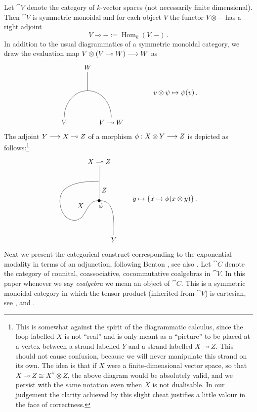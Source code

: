 \documentclass[english,letter paper,12pt,reqno]{article}
\def\mapnode{\node[circle,draw=black,fill=black,inner sep=0.5mm]}
\theoremstyle{example}
\def\Hom{\operatorname{Hom}}
\begin{document}
Let $\cat{V}$ denote the category of $k$-vector spaces (not necessarily finite dimensional). Then $\cat{V}$ is symmetric monoidal and for each object $V$ the functor $V \otimes -$ has a right adjoint
\[
V \multimap - := \Hom_k(V, -)\,.
\]
In addition to the usual diagrammatics of a symmetric monoidal category, we draw the evaluation map $V \otimes (V \multimap W) \longrightarrow W$ as
\begin{equation}\label{eq:diagram_eval_map}
\begin{tikzpicture}[scale=0.4,auto,baseline=(current  bounding  box.center)]
\node (topr) at (0,3) {$W$};
\coordinate (o) at (0,0) {};
\node (bottoml) at (-3,-4) {$V$};
\node (bottomr) at (3,-4) {$V \multimap W$};
\draw[out=90,in=180] (bottoml) to (o);
\draw[out=90,in=0] (bottomr) to (o);
\draw (o) to (topr);
\end{tikzpicture}
\qquad\qquad
v \otimes \psi \mapsto \psi(v)\,.
\end{equation}
The adjoint $Y \longrightarrow X \multimap Z$ of a morphism $\phi: X \otimes Y \longrightarrow Z$ is depicted as follows:\footnote{This is somewhat against the spirit of the diagrammatic calculus, since the loop labelled $X$ is not ``real'' and is only meant as a ``picture'' to be placed at a vertex between a strand labelled $Y$ and a strand labelled $X \multimap Z$. This should not cause confusion, because we will never manipulate this strand on its own. The idea is that if $X$ were a finite-dimensional vector space, so that $X \multimap Z \cong X^{\vee} \otimes Z$, the above diagram would be absolutely valid, and we persist with the same notation even when $X$ is not dualisable. In our judgement the clarity achieved by this slight cheat justifies a little valour in the face of correctness.}
\begin{equation}\label{eq:diagram_adjoint_of_map}
\begin{tikzpicture}[scale=0.5,auto,baseline=(current  bounding  box.center)]
\node (topr) at (1,4) {$X \multimap Z$};
\mapnode (o) at (1,0) {};
\node [below] at (o.east) {$\phi$};
\node (gamma) at (2.5,-4) {$Y$};
\draw[out=90,in=0] (gamma) to (o);
\draw[out=0,in=180] (-1.5,-2) to node {$X$} (o);
\draw[out=180,in=270] (-1.5,-2) to (-3,0);
\draw[out=90,in=180] (-3,0) to (1,2);
\draw (o) to node [swap] {$Z$} (1,2);
\draw (1,2) to (topr);
\end{tikzpicture}
\qquad
y \mapsto \{ x \mapsto \phi( x \otimes y ) \}\,.
\end{equation}
Next we present the categorical construct corresponding to the exponential modality in terms of an adjunction, following Benton \cite{benton}, see also \cite[\S 7]{mellies}. Let $\cat{C}$ denote the category of counital, coassociative, cocommutative coalgebras in $\cat{V}$. In this paper whenever we say \emph{coalgebra} we mean an object of $\cat{C}$. This is a symmetric monoidal category in which the tensor product (inherited from $\cat{V}$) is cartesian, see \cite[Theorem 6.4.5]{sweedler}, \cite{barr} and \cite[\S 6.5]{mellies}. 
\end{document}
